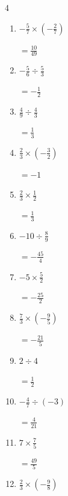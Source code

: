 \begin{multicols}{4}
\begin{enumerate}
        $\displaystyle =\frac{7}{5}$

  \item $\displaystyle -\frac{5}{7}\times{}\left(-\frac{2}{7}\right)$

        $\displaystyle =\frac{10}{49}$

  \item $\displaystyle -\frac{5}{6}\div{}\frac{5}{3}$

        $\displaystyle =-\frac{1}{2}$

  \item $\displaystyle \frac{4}{9}\div{}\frac{4}{3}$

        $\displaystyle =\frac{1}{3}$

  \item $\displaystyle \frac{2}{3}\times{}\left(-\frac{3}{2}\right)$

        $\displaystyle =-1$

  \item $\displaystyle \frac{2}{3}\times{}\frac{1}{2}$

        $\displaystyle =\frac{1}{3}$

  \item $\displaystyle -10\div{}\frac{8}{9}$

        $\displaystyle =-\frac{45}{4}$

  \item $\displaystyle -5\times{}\frac{5}{2}$

        $\displaystyle =-\frac{25}{2}$

  \item $\displaystyle \frac{7}{3}\times{}\left(-\frac{9}{5}\right)$

        $\displaystyle =-\frac{21}{5}$

\columnbreak %

  \item $\displaystyle 2\div{}4$

        $\displaystyle =\frac{1}{2}$

  \item $\displaystyle -\frac{4}{7}\div{}\left(-3\right)$

        $\displaystyle =\frac{4}{21}$

  \item $\displaystyle 7\times{}\frac{7}{5}$

        $\displaystyle =\frac{49}{5}$

  \item $\displaystyle \frac{2}{3}\times{}\left(-\frac{9}{8}\right)$


\end{enumerate}
\end{multicols}
